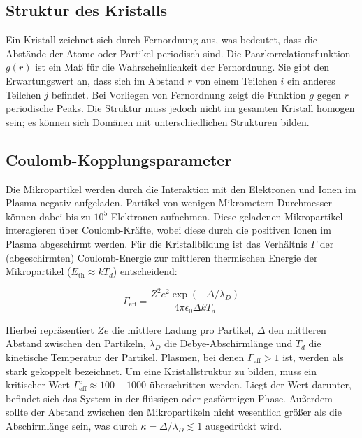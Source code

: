 \documentclass[12pt,a4paper,ngerman]{article}
\begin{document}
\subsection{Struktur des Kristalls}
Ein Kristall zeichnet sich durch Fernordnung aus, was bedeutet, dass die Abstände der Atome oder Partikel periodisch sind. Die Paarkorrelationsfunktion \( g(r) \) ist ein Maß für die Wahrscheinlichkeit der Fernordnung. Sie gibt den Erwartungswert an, dass sich im Abstand \( r \) von einem Teilchen \( i \) ein anderes Teilchen \( j \) befindet. Bei Vorliegen von Fernordnung zeigt die Funktion \( g \) gegen \( r \) periodische Peaks. Die Struktur muss jedoch nicht im gesamten Kristall homogen sein; es können sich Domänen mit unterschiedlichen Strukturen bilden.

\subsection{Coulomb-Kopplungsparameter}
Die Mikropartikel werden durch die Interaktion mit den Elektronen und Ionen im Plasma negativ aufgeladen. Partikel von wenigen Mikrometern Durchmesser können dabei bis zu \(10^5\) Elektronen aufnehmen. Diese geladenen Mikropartikel interagieren über Coulomb-Kräfte, wobei diese durch die positiven Ionen im Plasma abgeschirmt werden. Für die Kristallbildung ist das Verhältnis \( \Gamma \) der (abgeschirmten) Coulomb-Energie zur mittleren thermischen Energie der Mikropartikel (\(E_{\text{th}} \approx kT_d\)) entscheidend:

\[ \Gamma_{\text{eff}} = \frac{Z^2 e^2 \exp(-\Delta/\lambda_D)}{4 \pi \epsilon_0 \Delta kT_d} \]

Hierbei repräsentiert \(Ze\) die mittlere Ladung pro Partikel, \( \Delta \) den mittleren Abstand zwischen den Partikeln, \( \lambda_D \) die Debye-Abschirmlänge und \( T_d \) die kinetische Temperatur der Partikel. Plasmen, bei denen \( \Gamma_{\text{eff}} > 1 \) ist, werden als stark gekoppelt bezeichnet. Um eine Kristallstruktur zu bilden, muss ein kritischer Wert \( \Gamma_{\text{eff}}^c \approx 100 - 1000 \) überschritten werden. Liegt der Wert darunter, befindet sich das System in der flüssigen oder gasförmigen Phase. Außerdem sollte der Abstand zwischen den Mikropartikeln nicht wesentlich größer als die Abschirmlänge sein, was durch \( \kappa = \Delta/\lambda_D \lesssim 1 \) ausgedrückt wird.

\end{document}
